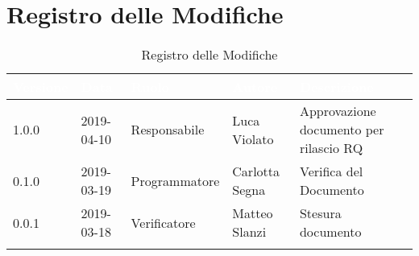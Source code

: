 \newpage

\section*{Registro delle Modifiche}

\begin{center}
\begin{longtable}[c]{|m{}|m{}|m{}|m{}|p{}|}
\hline
\rowcolor{bluelogo}\textbf{\textcolor{white}{Versione}} & \textbf{\textcolor{white}{Data}} & \textbf{\textcolor{white}{Ruolo}} & \textbf{\textcolor{white}{Autore}} & \textbf{\textcolor{white}{Descrizione}}\\
\hline \hline
\endfirsthead
1.0.0 & 2019-04-10 & Responsabile & Luca Violato & Approvazione documento per rilascio RQ \\
\hline
\rowcolor{grigio} 0.1.0 & 2019-03-19 & Programmatore & Carlotta Segna & Verifica del Documento \\
\hline
0.0.1 & 2019-03-18 & Verificatore & Matteo Slanzi & Stesura documento \\
\hline
\caption{Registro delle Modifiche}
\end{longtable}
\end{center}
